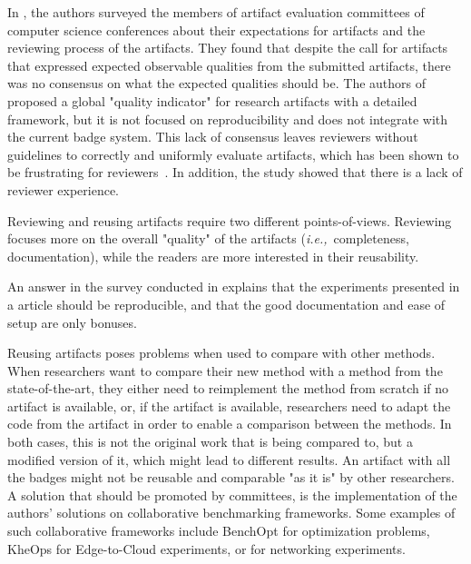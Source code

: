 \documentclass[sigconf,natbib=false]{acmart}
\newcommand{\ie}{\emph{i.e.,}}
\begin{document}
In \cite{hermann2020community}, the authors surveyed the members of artifact evaluation committees of computer science conferences about their expectations for artifacts and the reviewing process of the artifacts. 
They found that despite the call for artifacts that expressed expected observable qualities from the submitted artifacts, there was no consensus on what the expected qualities should be.
The authors of \cite{castell2024towards} proposed a global "quality indicator" for research artifacts with a detailed framework, but it is not focused on reproducibility and does not integrate with the current badge system.
This lack of consensus leaves reviewers without guidelines to correctly and uniformly evaluate artifacts, which has been shown to be frustrating for reviewers\ \cite{beller2020will}.
In addition, the study showed that there is a lack of reviewer experience.

Reviewing and reusing artifacts require two different points-of-views.
Reviewing focuses more on the overall "quality" of the artifacts (\ie\ completeness, documentation), while the readers are more interested in their reusability.

An answer in the survey conducted in \cite{hermann2020community} explains that the experiments presented in a article should be reproducible, and that the good documentation and ease of setup are only bonuses.

Reusing artifacts poses problems when used to compare with other methods.
When researchers want to compare their new method with a method from the state-of-the-art, they either need to reimplement the method from scratch if no artifact is available, or, if the artifact is available, researchers need to adapt the code from the artifact in order to enable a comparison between the methods.
In both cases, this is not the original work that is being compared to, but a modified version of it, which might lead to different results.
An artifact with all the badges might not be reusable and comparable "as it is" by other researchers.
A solution that should be promoted by committees, is the implementation of the authors' solutions on collaborative benchmarking frameworks.
Some examples of such collaborative frameworks include BenchOpt \cite{moreau2022benchopt} for optimization problems, KheOps \cite{rosendo2023kheops} for Edge-to-Cloud experiments, or \cite{sharma2017towards} for networking experiments.
\end{document}
